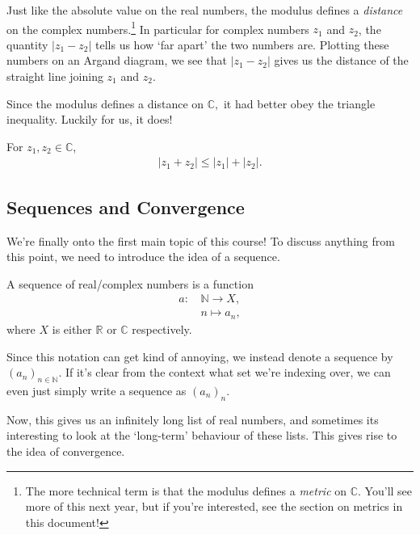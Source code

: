 \documentclass[
  12pt,
  a4paper]{extarticle}
\theoremstyle{plain}
\theoremstyle{definition}
\theoremstyle{plain}
\theoremstyle{plain}
\theoremstyle{plain}
\theoremstyle{plain}
\theoremstyle{definition}
\theoremstyle{definition}
\theoremstyle{remark}
\theoremstyle{remark}
\let\BeginKnitrBlock\begin \let\EndKnitrBlock\end
\renewcommand{\;}{\,}
\begin{document}
Just like the absolute value on the real numbers, the modulus defines a \emph{distance} on the complex numbers.\footnote{The more technical term is that the modulus defines a \emph{metric} on \(\mathbb{C}.\) You'll see more of this next year, but if you're interested, see the section on metrics in this document!} In particular for complex numbers \(z_1\) and \(z_2\), the quantity \(\lvert z_1 - z_2 \rvert\) tells us how `far apart' the two numbers are. Plotting these numbers on an Argand diagram, we see that \(\lvert z_1 - z_2 \rvert\) gives us the distance of the straight line joining \(z_1\) and \(z_2.\)

Since the modulus defines a distance on \(\mathbb{C},\) it had better obey the triangle inequality. Luckily for us, it does!

\BeginKnitrBlock{proposition}[Triangle Inequality]
{\label{prp:prop3} }For \(z_1,z_2 \in \mathbb{C}\),
\begin{align*}
\lvert z_1 + z_2 \rvert \leq \lvert z_1 \rvert + \lvert z_2 \rvert.
\end{align*}
\EndKnitrBlock{proposition}

\hypertarget{sequences-and-convergence}{%
\subsection{Sequences and Convergence}\label{sequences-and-convergence}}

We're finally onto the first main topic of this course! To discuss anything from this point, we need to introduce the idea of a sequence.
\BeginKnitrBlock{definition}[Sequence]
{\label{def:def1} }A sequence of real/complex numbers is a function
\begin{align*}
    a:\; &\mathbb{N} \longrightarrow X,\\
    &n \longmapsto a_n,
\end{align*}
where \(X\) is either \(\mathbb{R}\) or \(\mathbb{C}\) respectively.
\EndKnitrBlock{definition}
Since this notation can get kind of annoying, we instead denote a sequence by \((a_n)_{n\in\mathbb{N}}\). If it's clear from the context what set we're indexing over, we can even just simply write a sequence as \((a_n)_n\).

Now, this gives us an infinitely long list of real numbers, and sometimes its interesting to look at the `long-term' behaviour of these lists. This gives rise to the idea of convergence.
\end{document}
